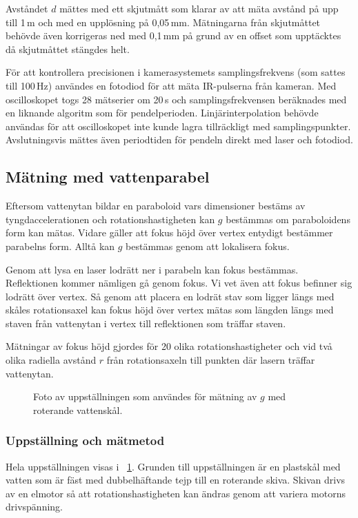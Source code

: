 \documentclass[11pt,a4paper]{article}
\newcommand{\figref}{\figurename~\ref}
\begin{document}
Avståndet $d$ mättes med ett skjutmått som klarar av att mäta avstånd på upp till 1\,m och med en upplösning på 0,05\,mm. Mätningarna från skjutmåttet behövde även korrigeras ned med 0,1\,mm på grund av en offset som upptäcktes då skjutmåttet stängdes helt.%

För att kontrollera precisionen i kamerasystemets samplingsfrekvens (som sattes till 100\,Hz) användes en fotodiod för att mäta IR-pulserna från kameran. Med oscilloskopet togs 28 mätserier om 20\,s och samplingsfrekvensen beräknades med en liknande algoritm som för pendelperioden. Linjärinterpolation behövde användas för att oscilloskopet inte kunde lagra tillräckligt med samplingspunkter. Avslutningsvis mättes även periodtiden för pendeln direkt med laser och fotodiod.



\subsection{Mätning med vattenparabel}
Eftersom vattenytan bildar en paraboloid vars dimensioner bestäms av tyngdaccelerationen och rotationshastigheten kan $g$ bestämmas om paraboloidens form kan mätas. Vidare gäller att fokus höjd över vertex entydigt bestämmer parabelns form. Alltå kan $g$ bestämmas genom att lokalisera fokus. 

Genom att lysa en laser lodrätt ner i parabeln kan fokus bestämmas. Reflektionen kommer nämligen gå genom fokus. Vi vet även att fokus befinner sig lodrätt över vertex. Så genom att placera en lodrät stav som ligger längs med skåles rotationsaxel kan fokus höjd över vertex mätas som längden längs med staven från vattenytan i vertex till reflektionen som träffar staven.

Mätningar av fokus höjd gjordes för 20 olika rotationshastigheter och vid två olika radiella avstånd $r$ från rotationsaxeln till punkten där lasern träffar vattenytan.

\begin{figure}
\centering
\resizebox{0.8\textwidth}{!}{}
\caption{\label{fig:rot_bowl_pic} Foto av uppställningen som användes för mätning av $g$ med roterande vattenskål. }
\end{figure}

\subsubsection{Uppställning och mätmetod}
Hela uppställningen visas i \figref{fig:rot_bowl_pic}. Grunden till uppställningen är en plastskål med vatten som är fäst med dubbelhäftande tejp till en roterande skiva. Skivan drivs av en elmotor så att rotationshastigheten kan ändras genom att variera  motorns drivspänning. 
\end{document}
